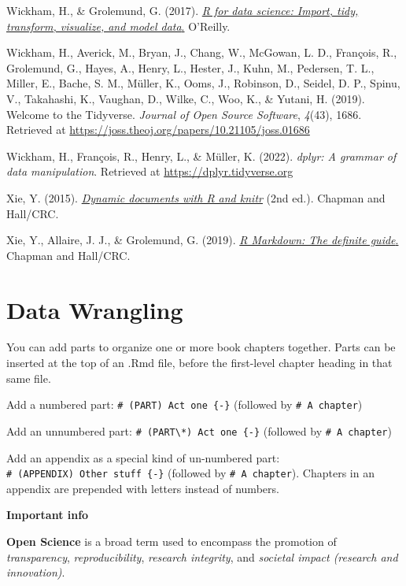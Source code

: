 \documentclass[
]{book}
\theoremstyle{definition}
\theoremstyle{definition}
\theoremstyle{definition}
\theoremstyle{definition}
\theoremstyle{remark}
\begin{document}
Wickham, H., \& Grolemund, G. (2017). \href{http://r4ds.had.co.nz}{\emph{R for data science: Import, tidy, transform, visualize, and model data}.} O'Reilly.

Wickham, H., Averick, M., Bryan, J., Chang, W., McGowan, L. D., François, R., Grolemund, G., Hayes, A., Henry, L., Hester, J., Kuhn, M., Pedersen, T. L., Miller, E., Bache, S. M., Müller, K., Ooms, J., Robinson, D., Seidel, D. P., Spinu, V., Takahashi, K., Vaughan, D., Wilke, C., Woo, K., \& Yutani, H. (2019). Welcome to the Tidyverse. \emph{Journal of Open Source Software}, \emph{4}(43), 1686. Retrieved at \url{https://joss.theoj.org/papers/10.21105/joss.01686}

Wickham, H., François, R., Henry, L., \& Müller, K. (2022). \emph{dplyr: A grammar of data manipulation}. Retrieved at \url{https://dplyr.tidyverse.org}

Xie, Y. (2015). \href{https://prism.librarymanagementcloud.co.uk/dmu/items/1039504}{\emph{Dynamic documents with R and knitr}} (2nd ed.). Chapman and Hall/CRC.

Xie, Y., Allaire, J. J., \& Grolemund, G. (2019). \href{http://bookdown.org/yihui/rmarkdown/}{\emph{R Markdown: The definite guide}.} Chapman and Hall/CRC.

\hypertarget{data-wrangling}{%
\chapter{Data Wrangling}\label{data-wrangling}}

You can add parts to organize one or more book chapters together. Parts can be inserted at the top of an .Rmd file, before the first-level chapter heading in that same file.

Add a numbered part: \texttt{\#\ (PART)\ Act\ one\ \{-\}} (followed by \texttt{\#\ A\ chapter})

Add an unnumbered part: \texttt{\#\ (PART\textbackslash{}*)\ Act\ one\ \{-\}} (followed by \texttt{\#\ A\ chapter})

Add an appendix as a special kind of un-numbered part: \texttt{\#\ (APPENDIX)\ Other\ stuff\ \{-\}} (followed by \texttt{\#\ A\ chapter}). Chapters in an appendix are prepended with letters instead of numbers.

\textbf{Important info}

\textbf{Open Science} is a broad term used to encompass the promotion of \emph{transparency}, \emph{reproducibility}, \emph{research integrity}, and \emph{societal impact (research and innovation)}.
\end{document}

